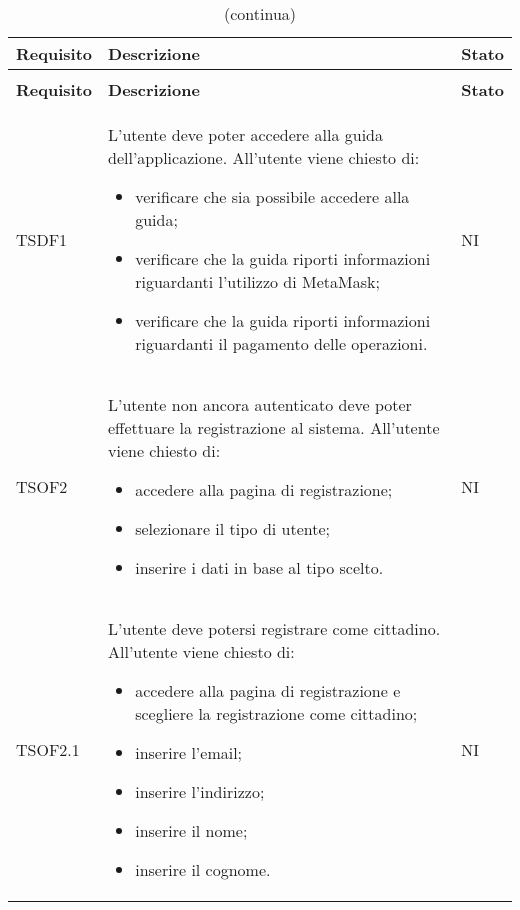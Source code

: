 	\begin{longtable}{ >{\centering}p{} >{\centering}p{}
			>{\centering}p{}}%
			
		\caption{Riepilogo Test di Accettazione}\\	
		\rowcolorhead
		\textbf{\color{white}Requisito} 
		& \textbf{\color{white}Descrizione} 
		& \centering\textbf{\color{white}Stato}
		\tabularnewline %
		\endfirsthead	
		
		\rowcolor{white}\caption[]{(continua)}\\	
		\rowcolorhead
		\textbf{\color{white}Requisito} 
		& \textbf{\color{white}Descrizione} 
		& \centering\textbf{\color{white}Stato}
		\tabularnewline %
		\endhead	
		
		 TSDF1	&	L'utente deve poter accedere alla guida dell'applicazione. All'utente viene
		chiesto di:
		\begin{itemize}
			\item verificare che sia possibile accedere alla guida;
			\item verificare che la guida riporti informazioni riguardanti l'utilizzo di
			MetaMask\glo{};
			\item verificare che la guida riporti informazioni riguardanti il pagamento
			delle operazioni. 
		\end{itemize}	&	NI
		\tabularnewline
		
		 TSOF2	&	L'utente non ancora autenticato deve poter effettuare la registrazione al
		sistema. All'utente viene chiesto di:
		\begin{itemize}
			\item accedere alla pagina di registrazione;
			\item selezionare il tipo di utente;
			\item inserire i dati in base al tipo scelto.
		\end{itemize}	&	NI
		\tabularnewline
		
		 TSOF2.1	&	L'utente deve potersi registrare come cittadino. All'utente viene chiesto di:
		\begin{itemize}
			\item accedere alla pagina di registrazione e scegliere la registrazione
			come cittadino;
			\item inserire l'email;
			\item inserire l'indirizzo;
			\item inserire il nome;
			\item inserire il cognome.
		\end{itemize}	&	NI
		\tabularnewline
		

\end{longtable}
